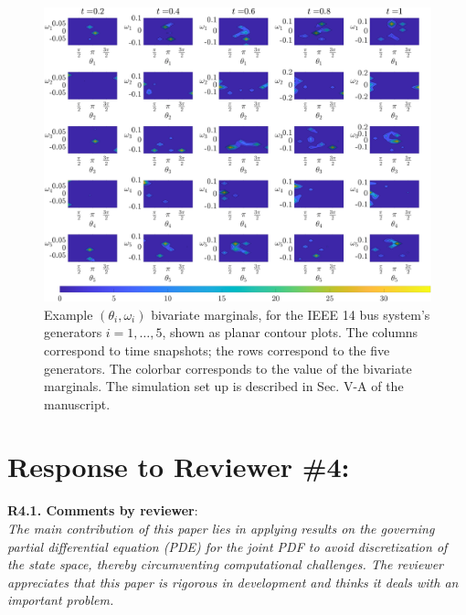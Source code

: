 \documentclass[12pt,onecolumn]{IEEEtran}
\newcommand{\blue}{\color{blue}}
\newcommand{\nib}{\noindent  {\bf Response:} }
\begin{document}
\begin{figure}[t]
\centering
\includegraphics[width=0.99\linewidth]{IEEE14marginals.png}
\caption{\small{Example $(\theta_i,\omega_i)$ bivariate marginals, for the IEEE 14 bus system's generators $i=1,\hdots, 5$, shown as planar contour plots. The columns correspond to time snapshots; the rows correspond to the five generators. The colorbar corresponds to the value of the bivariate marginals. The simulation set up is described in Sec. V-A of the manuscript.}}
\vspace*{-0.1in}
\label{fig:PlanarContourBivariateMarginals}
\end{figure}




\newpage
\section*{\large \bf Response to Reviewer \#4:}

\noindent
{\bf R4.1. Comments by reviewer}:\\
{\em The main contribution of this paper lies in applying results on the governing partial differential equation (PDE) for the joint PDF to avoid discretization of the state space, thereby circumventing computational challenges. The reviewer appreciates that this paper is rigorous in development and thinks it deals with an important problem.}

{\nib \blue{We appreciate the positive remark.}}
\end{document}
